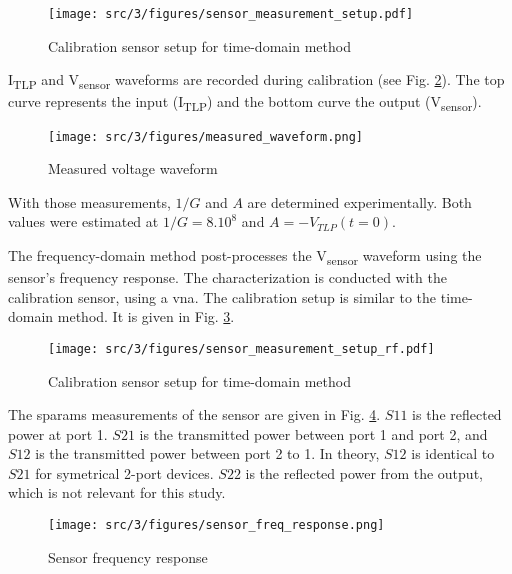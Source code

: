 \begin{figure}[!h]
  \centering
  \texttt{[image: src/3/figures/sensor\_measurement\_setup.pdf]}
  \caption{Calibration sensor setup for time-domain method}
  \label{fig:calibration-sensor}
\end{figure}

I\textsubscript{TLP} and V\textsubscript{sensor} waveforms are recorded during calibration (see Fig. \ref{fig:measurement-nfs}).
The top curve represents the input (I\textsubscript{TLP}) and the bottom curve the output (V\textsubscript{sensor}).

\begin{figure}[!h]
  \centering
  \texttt{[image: src/3/figures/measured\_waveform.png]}
  \caption{Measured voltage waveform}
  \label{fig:measurement-nfs}
\end{figure}

With those measurements, $1/G$ and $A$ are determined experimentally.
Both values were estimated at $1/G = 8.10^8$ and $A = -V_{TLP}(t = 0)$.

The frequency-domain method post-processes the V\textsubscript{sensor} waveform using the sensor's frequency response.
The characterization is conducted with the calibration sensor, using a \gls{vna}.
The calibration setup is similar to the time-domain method.
It is given in Fig. \ref{fig:calibration-sensor-rf}.

\begin{figure}[!h]
  \centering
  \texttt{[image: src/3/figures/sensor\_measurement\_setup\_rf.pdf]}
  \caption{Calibration sensor setup for time-domain method}
  \label{fig:calibration-sensor-rf}
\end{figure}

The \gls{sparams} measurements of the sensor are given in Fig. \ref{fig:sensor-response}.
$S11$ is the reflected power at port 1.
$S21$ is the transmitted power between port 1 and port 2, and $S12$ is the transmitted power between port 2 to 1.
In theory, $S12$ is identical to $S21$ for symetrical 2-port devices.
$S22$ is the reflected power from the output, which is not relevant for this study.

\begin{figure}[!h]
  \centering
  \texttt{[image: src/3/figures/sensor\_freq\_response.png]}
  \caption{Sensor frequency response}
  \label{fig:sensor-response}
\end{figure}

